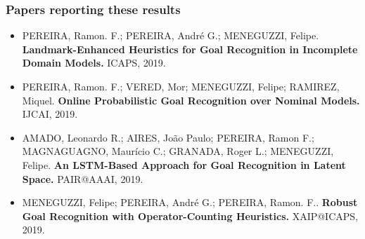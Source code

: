 \documentclass[usenames,dvipsnames]{beamer}
\begin{document}
\begin{frame}[c, allowframebreaks]\frametitle{Papers reporting these results}
	\footnotesize
	\begin{itemize}
	\item[] PEREIRA, Ramon. F.; PEREIRA, André G.; MENEGUZZI, Felipe. \textbf{Landmark-Enhanced Heuristics for Goal Recognition in Incomplete Domain Models.} ICAPS, 2019. 
	\item[] PEREIRA, Ramon. F.; VERED, Mor; MENEGUZZI, Felipe; RAMIREZ, Miquel. \textbf{Online Probabilistic Goal Recognition over Nominal Models.} IJCAI, 2019. 
	\item[] AMADO, Leonardo R.; AIRES, João Paulo; PEREIRA, Ramon F.; MAGNAGUAGNO, Maurício C.; GRANADA, Roger L.; MENEGUZZI, Felipe. \textbf{An LSTM-Based Approach for Goal Recognition in Latent Space.} PAIR@AAAI, 2019. 
	\item[] MENEGUZZI, Felipe; PEREIRA, André G.; PEREIRA, Ramon. F.. \textbf{Robust Goal Recognition with Operator-Counting Heuristics.} XAIP@ICAPS, 2019.  
	
	\framebreak
	

\end{itemize}
\end{frame}
\end{document}
